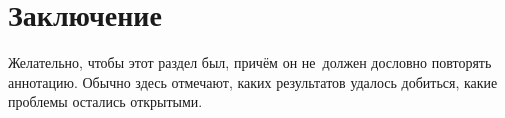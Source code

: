 \documentclass[12pt, twoside]{article}
\begin{document}
\section{Заключение}
Желательно, чтобы этот раздел был, причём он не~должен дословно повторять аннотацию.
Обычно здесь отмечают, каких результатов удалось добиться, какие проблемы остались открытыми.






\end{document}
